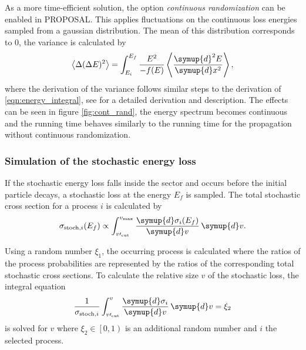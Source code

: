 As a more time-efficient solution, the option \emph{continuous randomization} can be enabled in PROPOSAL.
This applies fluctuations on the continuous loss energies sampled from a gaussian distribution.
The mean of this distribution corresponds to $0$, the variance is calculated by
%
\begin{equation}
	\left< \Delta (\Delta E)^2 \right> = \int_{E_i}^{E_f} \frac{E^2}{-f(E)} \left< \frac{\symup{d}^2E}{\symup{d}x^2} \right>,
\end{equation}
%
where the derivation of the variance follows similar steps to the derivation of \eqref{eqn:energy_integral}, see \cite{chirkin2004propagating} for a detailed derivation and description. 
The effects can be seen in figure \ref{fig:cont_rand}, the energy spectrum becomes continuous and the running time behaves similarly to the running time for the propagation without continuous randomization.


\subsubsection{Simulation of the stochastic energy loss}

If the stochastic energy loss falls inside the sector and occurs before the initial particle decays, a stochastic loss at the energy $E_f$ is sampled.
The total stochastic cross section for a process $i$ is calculated by
%
\begin{equation}
	\label{eqn:stoch_crosssection}
	\sigma_{\text{stoch},i}(E_f) \propto \int_{v\prime_\text{cut}}^{v_\text{max}} \frac{\symup{d}\sigma_i(E_f)}{\symup{d}v} \, \symup{d}v.
\end{equation}

Using a random number $\xi_1$, the occurring process is calculated where the ratios of the process probabilities are represented by the ratios of the corresponding total stochastic cross sections.
To calculate the relative size $v$ of the stochastic loss, the integral equation
%
\begin{equation}
	\label{eqn:sample_v}
	\frac{1}{\sigma_{\text{stoch},i}} \int_{v\prime_\text{cut}}^{v} \frac{\symup{d}\sigma_i}{\symup{d}v} \, \symup{d}v = \xi_2
\end{equation}
%
is solved for $v$ where $\xi_2 \in \left[0,1\right)$ is an additional random number and $i$ the selected process.

